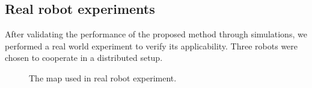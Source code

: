 \documentclass[smallcondensed]{svjour3}
\begin{document}
\subsection{Real robot experiments}

After validating the performance of the proposed method through simulations, we performed a real world experiment to verify its applicability. Three robots were chosen to cooperate in a distributed setup. 

\begin{figure}[h]
\centering
{}
\caption{The map used in real robot experiment.}
\label{fig:depmap}
\end{figure}
\end{document}
